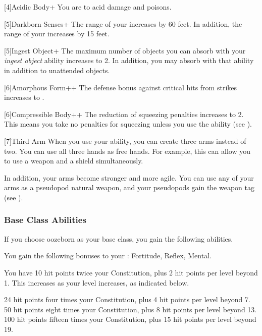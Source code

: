             [4]{Acidic Body+} You are  to acid damage and poisons.

            [5]{Darkborn Senses+} The range of your  increases by 60 feet.
            In addition, the range of your  increases by 15 feet.

            [5]{Ingest Object+} The maximum number of objects you can absorb with your \textit{ingest object} ability increases to 2.
            In addition, you may absorb  with that ability in addition to unattended objects.

            [6]{Amorphous Form++} The defense bonus against critical hits from strikes increases to .

            [6]{Compressible Body++} The reduction of squeezing penalties increases to 2.
            This means you take no penalties for squeezing unless you use the  ability (see ).

            [7]{Third Arm} When you use your  ability, you can create three arms instead of two.
            You can use all three hands as free hands.
            For example, this can allow you to use a  weapon and a shield simultaneously.

            In addition, your arms become stronger and more agile.
            You can use any of your arms as a pseudopod natural weapon, and your pseudopods gain the  weapon tag (see ).

        \subsubsection{Base Class Abilities}
            If you choose oozeborn as your base class, you gain the following abilities.

            You gain the following bonuses to your :  Fortitude,  Reflex,  Mental.

                You have 10 hit points \add twice your Constitution, plus 2 hit points per level beyond 1.
                This increases as your level increases, as indicated below.
                \begin{itemize}
                     24 hit points \add four times your Constitution, plus 4 hit points per level beyond 7.
                     50 hit points \add eight times your Constitution, plus 8 hit points per level beyond 13.
                     100 hit points \add fifteen times your Constitution, plus 15 hit points per level beyond 19.
                \end{itemize}


